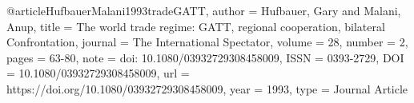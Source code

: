 

@article{HufbauerMalani1993tradeGATT,
   author = {Hufbauer, Gary and Malani, Anup},
   title = {The world trade regime: GATT, regional cooperation, bilateral Confrontation},
   journal = {The International Spectator},
   volume = {28},
   number = {2},
   pages = {63-80},
   note = {doi: 10.1080/03932729308458009},
   ISSN = {0393-2729},
   DOI = {10.1080/03932729308458009},
   url = {https://doi.org/10.1080/03932729308458009},
   year = {1993},
   type = {Journal Article}
}


